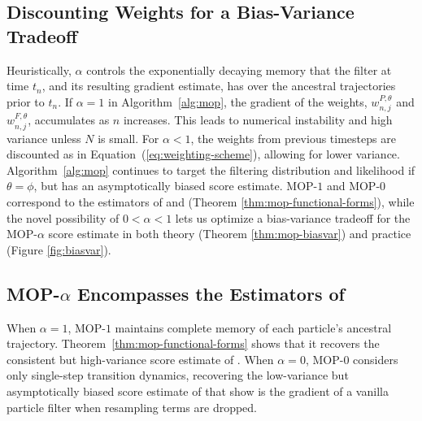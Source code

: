 \documentclass[9pt,twocolumn,pnasresearcharticle]{pnas-new}
\newcommand\arxiv[2]{#2} %
\begin{document}


\arxiv{}{\vspace*{-2mm}}
\subsection{Discounting Weights for a Bias-Variance Tradeoff}

Heuristically, $\alpha$ controls the exponentially decaying memory that the filter at time $t_n$, and its resulting gradient estimate, has over the ancestral trajectories prior to $t_n$. If $\alpha=1$ in Algorithm~\ref{alg:mop}, the gradient of the weights, $w^{P,\theta}_{n,j}$ and $w^{F,\theta}_{n,j}$, accumulates as $n$ increases.
This leads to numerical instability and high variance unless $N$ is small.
For $\alpha<1$, the weights from previous timesteps are discounted as in Equation~(\ref{eq:weighting-scheme}), allowing for lower variance. Algorithm~\ref{alg:mop} continues to target the filtering distribution and likelihood if $\theta=\phi$, but has an asymptotically biased score estimate.
MOP-$1$ and MOP-$0$ correspond to the estimators of \cite{poyiadjis11} and \cite{naesseth18} (Theorem \ref{thm:mop-functional-forms}), while the novel possibility of $0<\alpha<1$ lets us optimize a bias-variance tradeoff for the MOP-$\alpha$ score estimate in both theory (Theorem \ref{thm:mop-biasvar}) and practice (Figure \ref{fig:biasvar}). 


\arxiv{}{\vspace*{-2mm}}
\subsection{MOP-$\alpha$ Encompasses the Estimators of \cite{poyiadjis11, scibior21, naesseth18}}

When $\alpha=1$, MOP-$1$ maintains complete memory of each particle's ancestral trajectory. Theorem~\ref{thm:mop-functional-forms} shows that it recovers the consistent but high-variance score estimate of \cite{poyiadjis11}. 
When $\alpha=0$, MOP-$0$ considers only single-step transition dynamics, recovering the low-variance but asymptotically biased score estimate of \cite{naesseth18} that \cite{scibior21} show is the gradient of a vanilla particle filter when resampling terms are dropped. 
\end{document}
